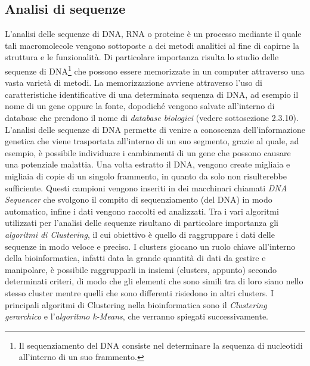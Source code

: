 \subsection{Analisi di sequenze}
L'analisi delle sequenze di DNA, RNA o proteine è un processo mediante il quale tali macromolecole vengono sottoposte a dei metodi analitici al fine di capirne la struttura e le funzionalità.
\newline
Di particolare importanza risulta lo studio delle sequenze di DNA\footnote{Il sequenziamento del DNA consiste nel determinare la sequenza di nucleotidi all'interno di un suo frammento.} che possono essere memorizzate in un computer attraverso una vasta varietà di metodi.
La memorizzazione avviene attraverso l'uso di caratteristiche identificative di una determinata sequenza di DNA, ad esempio il nome di un gene oppure la fonte, dopodiché vengono salvate all'interno di database che prendono il nome di \textit{database biologici} (vedere sottosezione 2.3.10).
\newline
L'analisi delle sequenze di DNA permette di venire a conoscenza dell'informazione genetica che viene trasportata all'interno di un suo segmento, grazie al quale, ad esempio, è possibile individuare i cambiamenti di un gene che possono causare una potenziale malattia.
\newline
Una volta estratto il DNA, vengono create migliaia e migliaia di copie di un singolo frammento, in quanto da solo non risulterebbe sufficiente. Questi campioni vengono inseriti in dei macchinari chiamati \textit{DNA Sequencer} che svolgono il compito di sequenziamento (del DNA) in modo automatico, infine i dati vengono raccolti ed analizzati.
\newline
Tra i vari algoritmi utilizzati per l'analisi delle sequenze risultano di particolare importanza gli \textit{algoritmi di Clustering}, il cui obiettivo è quello di raggruppare i dati delle sequenze in modo veloce e preciso. I clusters giocano un ruolo chiave all'interno della bioinformatica, infatti data la grande quantità di dati da gestire e manipolare, è possibile raggrupparli in insiemi (clusters, appunto) secondo determinati criteri, di modo che gli elementi che sono simili tra di loro siano nello stesso cluster mentre quelli che sono differenti risiedono in altri clusters. I principali algoritmi di Clustering nella bioinformatica sono il \textit{Clustering gerarchico} e l'\textit{algoritmo k-Means}, che verranno spiegati successivamente.

